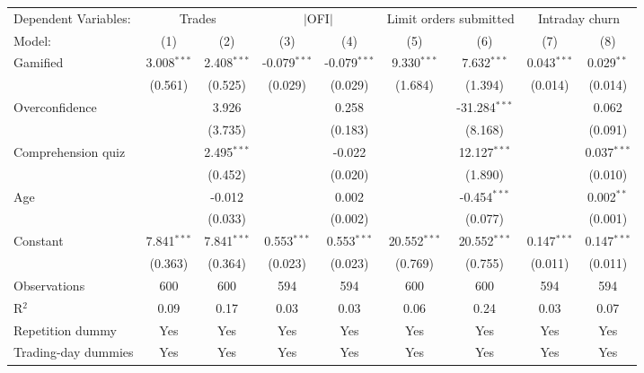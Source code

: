 \begin{tabular}{lcccccccc}
   \tabularnewline \midrule \midrule
   Dependent Variables: & \multicolumn{2}{c}{Trades} & \multicolumn{2}{c}{$|$OFI$|$} & \multicolumn{2}{c}{Limit orders submitted} & \multicolumn{2}{c}{Intraday churn}\\
   Model:              & (1)           & (2)           & (3)            & (4)            & (5)            & (6)             & (7)           & (8)\\  
   \midrule
   Gamified            & 3.008$^{***}$ & 2.408$^{***}$ & -0.079$^{***}$ & -0.079$^{***}$ & 9.330$^{***}$  & 7.632$^{***}$   & 0.043$^{***}$ & 0.029$^{**}$\\   
                       & (0.561)       & (0.525)       & (0.029)        & (0.029)        & (1.684)        & (1.394)         & (0.014)       & (0.014)\\   
   Overconfidence      &               & 3.926         &                & 0.258          &                & -31.284$^{***}$ &               & 0.062\\   
                       &               & (3.735)       &                & (0.183)        &                & (8.168)         &               & (0.091)\\   
   Comprehension quiz  &               & 2.495$^{***}$ &                & -0.022         &                & 12.127$^{***}$  &               & 0.037$^{***}$\\   
                       &               & (0.452)       &                & (0.020)        &                & (1.890)         &               & (0.010)\\   
   Age                 &               & -0.012        &                & 0.002          &                & -0.454$^{***}$  &               & 0.002$^{**}$\\   
                       &               & (0.033)       &                & (0.002)        &                & (0.077)         &               & (0.001)\\   
   Constant            & 7.841$^{***}$ & 7.841$^{***}$ & 0.553$^{***}$  & 0.553$^{***}$  & 20.552$^{***}$ & 20.552$^{***}$  & 0.147$^{***}$ & 0.147$^{***}$\\   
                       & (0.363)       & (0.364)       & (0.023)        & (0.023)        & (0.769)        & (0.755)         & (0.011)       & (0.011)\\   
   \midrule
   Observations        & 600           & 600           & 594            & 594            & 600            & 600             & 594           & 594\\  
   R$^2$               & 0.09          & 0.17          & 0.03           & 0.03           & 0.06           & 0.24            & 0.03          & 0.07\\  
   Repetition dummy    & Yes           & Yes           & Yes            & Yes            & Yes            & Yes             & Yes           & Yes\\  
   Trading-day dummies & Yes           & Yes           & Yes            & Yes            & Yes            & Yes             & Yes           & Yes\\  
   \midrule \midrule
\end{tabular}
